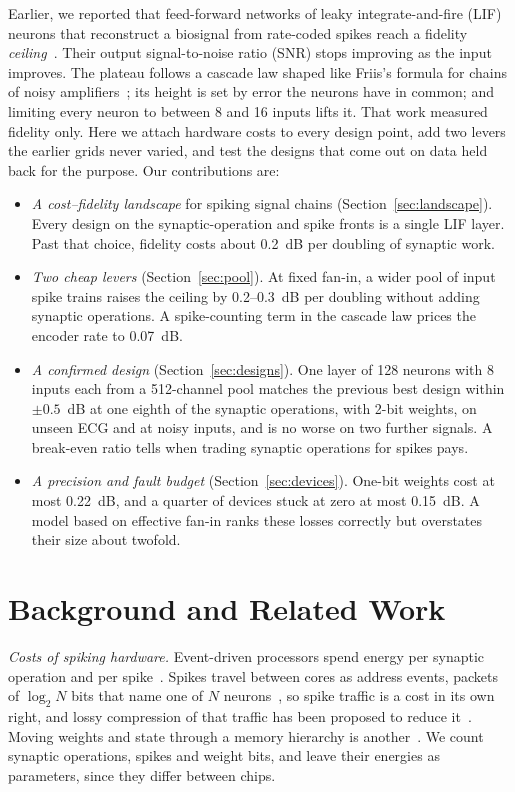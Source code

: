 \documentclass[conference]{IEEEtran}
\newcommand{\dB}{~dB}
\begin{document}
Earlier, we reported that feed-forward networks of leaky integrate-and-fire
(LIF) neurons that reconstruct a biosignal from rate-coded spikes reach a
fidelity \emph{ceiling}~\cite{baig2026icee}. Their output
signal-to-noise ratio (SNR) stops improving as the input improves. The
plateau follows a cascade law shaped like Friis's formula for chains of noisy
amplifiers~\cite{friis1944noise}; its height is set by error the neurons have
in common; and limiting every neuron to between 8 and 16 inputs lifts it. That work measured fidelity only. Here we
attach hardware costs to every design point, add two levers the earlier grids
never varied, and test the designs that come out on data held back for the
purpose. Our contributions are:
\begin{itemize}
\item \emph{A cost--fidelity landscape} for spiking signal chains
(Section~\ref{sec:landscape}). Every design on the synaptic-operation and
spike fronts is a single LIF layer. Past that choice, fidelity costs about
0.2\dB{} per doubling of synaptic work.
\item \emph{Two cheap levers} (Section~\ref{sec:pool}). At fixed fan-in, a
wider pool of input spike trains raises the ceiling by 0.2--0.3\dB{} per
doubling without adding synaptic operations. A spike-counting term in the
cascade law prices the encoder rate to 0.07\dB.
\item \emph{A confirmed design} (Section~\ref{sec:designs}). One layer of 128
neurons with 8 inputs each from a 512-channel pool matches the previous best
design within $\pm0.5$\dB{} at one eighth of the synaptic operations, with
2-bit weights, on unseen ECG and at noisy inputs, and is no worse on two
further signals. A
break-even ratio tells when trading synaptic operations for spikes pays.
\item \emph{A precision and fault budget} (Section~\ref{sec:devices}). One-bit
weights cost at most 0.22\dB, and a quarter of devices stuck at zero at most
0.15\dB. A model based on effective fan-in ranks these losses correctly but
overstates their size about twofold.
\end{itemize}

\section{Background and Related Work}

\emph{Costs of spiking hardware.} Event-driven processors spend energy per
synaptic operation and per spike~\cite{davies2018loihi,sorbaro2020energy}.
Spikes travel between cores as address events, packets of $\log_2 N$ bits that
name one of $N$ neurons~\cite{boahen2000aer}, so spike traffic is a cost in its
own right, and lossy compression of that traffic has been proposed to reduce
it~\cite{ganesh2025fspc}. Moving weights and state through a memory hierarchy is
another~\cite{chee2025profiling}. We count synaptic operations, spikes and
weight bits, and leave their energies as parameters, since they differ between
chips.
\end{document}
